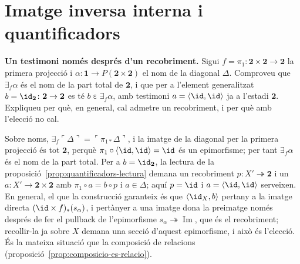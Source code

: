 \section{Imatge inversa interna i quantificadors}\label{prac:quantificadors}

\begin{exercici}
\textbf{Un testimoni només després d'un recobriment.} Sigui \(f=\pi_1\colon\mathbf2\times\mathbf2\to\mathbf2\) la primera projecció i \(\alpha\colon\mathbf1\to P(\mathbf2\times\mathbf2)\) el nom de la diagonal \(\Delta\). Comproveu que \(\exists_f\alpha\) és el nom de la part total de \(\mathbf2\), i que per a l'element generalitzat \(b=\id_{\mathbf2}\colon\mathbf2\to\mathbf2\) es té \(b\mathrel{\varepsilon}\exists_f\alpha\), amb testimoni \(a=\langle\id,\id\rangle\) ja a l'estadi \(\mathbf2\). Expliqueu per què, en general, cal admetre un recobriment, i per què amb l'elecció no cal.
\end{exercici}
\begin{solucio}
Sobre noms, \(\exists_f\ulcorner\Delta\urcorner=\ulcorner\pi_{1*}\Delta\urcorner\), i la imatge de la diagonal per la primera projecció és tot \(\mathbf2\), perquè \(\pi_1\circ\langle\id,\id\rangle=\id\) és un epimorfisme; per tant \(\exists_f\alpha\) és el nom de la part total. Per a \(b=\id_{\mathbf2}\), la lectura de la proposició~\ref{prop:quantificadors-lectura} demana un recobriment \(p\colon X'\twoheadrightarrow\mathbf2\) i un \(a\colon X'\to\mathbf2\times\mathbf2\) amb \(\pi_1\circ a=b\circ p\) i \(a\in\Delta\); aquí \(p=\id\) i \(a=\langle\id,\id\rangle\) serveixen. En general, el que la construcció garanteix és que \(\langle\id_X,b\rangle\) pertany a la imatge directa \((\id\times f)_*(s_\alpha)\), i pertànyer a una imatge dona la preimatge només després de fer el pullback de l'epimorfisme \(s_\alpha\twoheadrightarrow\operatorname{Im}\), que és el recobriment; recollir-la ja sobre \(X\) demana una secció d'aquest epimorfisme, i això és l'elecció. És la mateixa situació que la composició de relacions (proposició~\ref{prop:composicio-es-relacio}).
\end{solucio}

